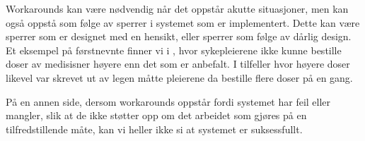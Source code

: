 \noindent
Workarounds kan være nødvendig når det oppstår akutte situasjoner, men kan også oppstå som følge av sperrer i systemet som er implementert. Dette kan være sperrer som er designet med en hensikt, eller sperrer som følge av dårlig design. Et eksempel på førstnevnte finner vi i \cite{Vogelsmeier08}, hvor sykepleierene ikke kunne bestille doser av medisisner høyere enn det som er anbefalt. I tilfeller hvor høyere doser likevel var skrevet ut av legen måtte pleierene da bestille flere doser på en gang.  

På en annen side, dersom workarounds oppstår fordi systemet har feil eller mangler, slik at de ikke støtter opp om det arbeidet som gjøres på en tilfredstillende måte, kan vi heller ikke si at systemet er suksessfullt.